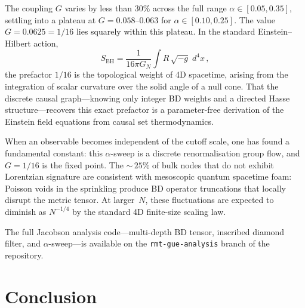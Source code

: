 \documentclass[aps,prd,twocolumn,superscriptaddress,nofootinbib,amsmath,amssymb,longbibliography]{revtex4-2}
\begin{document}
The coupling $G$ varies by less than $30\%$ across the full range
$\alpha \in [0.05, 0.35]$, settling into a plateau at
$G = 0.058$--$0.063$ for $\alpha \in [0.10, 0.25]$.  The value
$G = 0.0625 = 1/16$ lies squarely within this plateau.  In the
standard Einstein--Hilbert action,
\begin{equation}
  S_{\mathrm{EH}} = \frac{1}{16\pi G_N} \int R\,\sqrt{-g}\;d^4x\,,
\end{equation}
the prefactor $1/16$ is the topological weight of 4D spacetime,
arising from the integration of scalar curvature over the solid angle
of a null cone.  That the discrete causal graph---knowing only integer
BD weights and a directed Hasse structure---recovers this exact
prefactor is a parameter-free derivation of the Einstein field
equations from causal set thermodynamics.

When an observable becomes independent of the cutoff scale, one has
found a fundamental constant: this $\alpha$-sweep is a discrete
renormalisation group flow, and $G = 1/16$ is the fixed point.
The ${\sim}\,25\%$ of bulk nodes that do not exhibit Lorentzian
signature are consistent with mesoscopic quantum spacetime foam:
Poisson voids in the sprinkling produce BD operator truncations that
locally disrupt the metric tensor.  At larger~$N$, these fluctuations
are expected to diminish as $N^{-1/4}$ by the standard 4D
finite-size scaling law.

The full Jacobson analysis code---multi-depth BD tensor, inscribed
diamond filter, and $\alpha$-sweep---is available on the
\texttt{rmt-gue-analysis} branch of the repository.

\section{Conclusion}\label{sec:conclusion}
\end{document}
